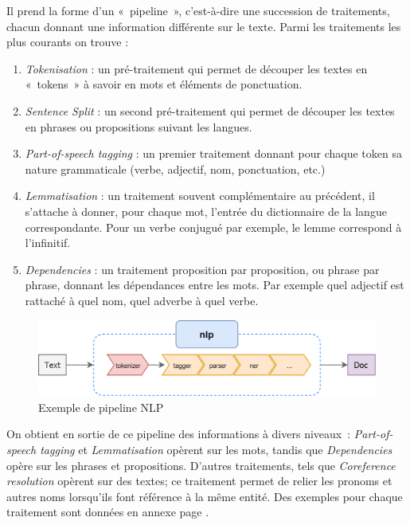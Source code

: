 Il prend la forme d'un «~pipeline~», c'est-à-dire une succession de traitements, chacun donnant une information différente sur le texte. Parmi les traitements les plus courants on trouve :
\begin{enumerate}
    \item \textit{Tokenisation} : un pré-traitement qui permet de découper les textes en «~tokens~» à savoir en mots et éléments de ponctuation.
    \vspace{5pt}
    \item \textit{Sentence Split} : un second pré-traitement qui permet de découper les textes en phrases ou propositions suivant les langues.
    \vspace{5pt}
    \item \textit{Part-of-speech tagging} : un premier traitement donnant pour chaque token sa nature grammaticale (verbe, adjectif, nom, ponctuation, etc.)
    \vspace{5pt}
    \item \textit{Lemmatisation} : un traitement souvent complémentaire au précédent, il s'attache à donner, pour chaque mot, l'entrée du dictionnaire de la langue correspondante. Pour un verbe conjugué par exemple, le lemme correspond à l'infinitif.
    \vspace{5pt}
    \item \textit{Dependencies} : un traitement proposition par proposition, ou phrase par phrase, donnant les dépendances entre les mots. Par exemple quel adjectif est rattaché à quel nom, quel adverbe à quel verbe.
\end{enumerate}
\vspace{10pt}

\begin{figure}[H]
    \centering
    \includegraphics[scale=0.34]{images/Pipeline-example.png}
    \caption{Exemple de pipeline NLP}
    \label{fig:nlp-pipeline-example}
\end{figure}

\vspace{10pt}

On obtient en sortie de ce pipeline des informations à divers niveaux~: \textit{Part-of-speech tagging} et \textit{Lemmatisation} opèrent sur les mots, tandis que \textit{Dependencies} opère sur les phrases et propositions. D'autres traitements, tels que \textit{Coreference resolution} opèrent sur des textes; ce traitement permet de relier les pronoms et autres noms lorsqu'ils font référence à la même entité. Des exemples pour chaque traitement sont données en annexe page \pageref{nlp-exemple}.
\newline

